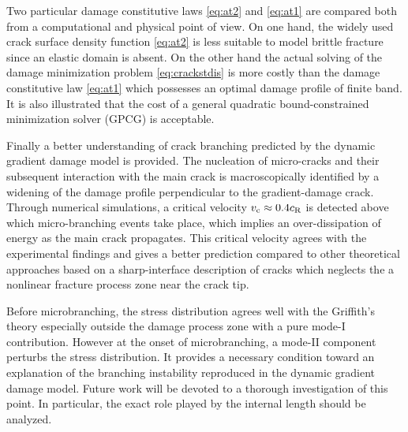 Two particular damage constitutive laws \eqref{eq:at2} and \eqref{eq:at1} are compared both from a computational and physical point of view. On one hand, the widely used crack surface density function \eqref{eq:at2} is less suitable to model brittle fracture since an elastic domain is absent. On the other hand the actual solving of the damage minimization problem \eqref{eq:crackstdis} is more costly than the damage constitutive law \eqref{eq:at1} which possesses an optimal damage profile of finite band. It is also illustrated that the cost of a general quadratic bound-constrained minimization solver (GPCG) is acceptable.

Finally a better understanding of crack branching predicted by the dynamic gradient damage model is provided. The nucleation of micro-cracks and their subsequent interaction with the main crack is macroscopically identified by a widening of the damage profile perpendicular to the gradient-damage crack. Through numerical simulations, a critical velocity $v_{\mathrm{c}}\approx 0.4c_\mathrm{R}$ is detected above which micro-branching events take place, which implies an over-dissipation of energy as the main crack propagates. This critical velocity agrees with the experimental findings and gives a better prediction compared to other theoretical approaches based on a sharp-interface description of cracks which neglects the a nonlinear fracture process zone near the crack tip.

Before microbranching, the stress distribution agrees well with the Griffith's theory especially outside the damage process zone with a pure mode-I contribution. However at the onset of microbranching, a mode-II component perturbs the stress distribution. It provides a necessary condition toward an explanation of the branching instability reproduced in the dynamic gradient damage model. Future work will be devoted to a thorough investigation of this point. In particular, the exact role played by the internal length should be analyzed.

